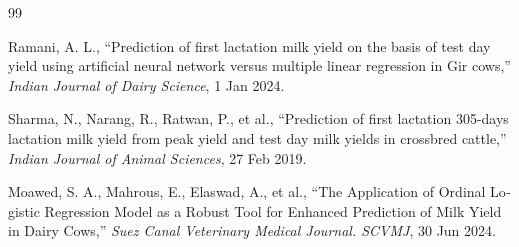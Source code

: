 \begin{thebibliography}{99}
\begin{latin}
	\noindent Ramani, A. L., ``Prediction of first lactation milk yield on the basis of test day yield using artificial neural network versus multiple linear regression in Gir cows,'' \textit{Indian Journal of Dairy Science}, 1 Jan 2024.
	
	\noindent Sharma, N., Narang, R., Ratwan, P., et al., ``Prediction of first lactation 305-days lactation milk yield from peak yield and test day milk yields in crossbred cattle,'' \textit{Indian Journal of Animal Sciences}, 27 Feb 2019.
	
	\noindent Moawed, S. A., Mahrous, E., Elaswad, A., et al., ``The Application of Ordinal Logistic Regression Model as a Robust Tool for Enhanced Prediction of Milk Yield in Dairy Cows,'' \textit{Suez Canal Veterinary Medical Journal. SCVMJ}, 30 Jun 2024.
	
	
	\end{latin}
	
\end{thebibliography}